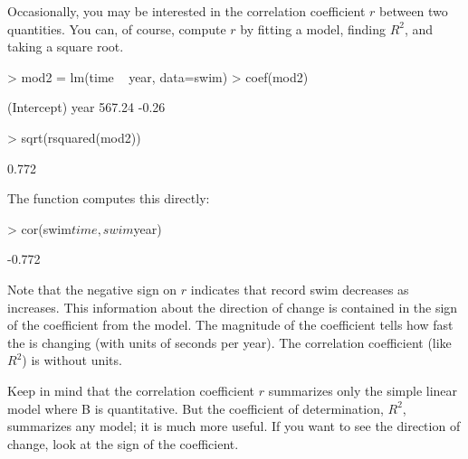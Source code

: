 Occasionally, you may be interested in the correlation coefficient $r$ between two
quantities.  
You can, of course, compute $r$ by fitting a model, finding $R^2$,
and taking a square root.
\begin{Schunk}
\begin{Sinput}
> mod2 = lm(time ~ year, data=swim)
> coef(mod2)
\end{Sinput}
\begin{Soutput}
(Intercept)        year 
     567.24       -0.26 
\end{Soutput}
\begin{Sinput}
> sqrt(rsquared(mod2))
\end{Sinput}
\begin{Soutput}
[1] 0.772
\end{Soutput}
\end{Schunk}

The  function computes this directly:
\begin{Schunk}
\begin{Sinput}
> cor(swim$time, swim$year)
\end{Sinput}
\begin{Soutput}
[1] -0.772
\end{Soutput}
\end{Schunk}

Note that the negative sign on $r$ indicates that record swim 
decreases as  increases.  This information about the
direction of change is contained in the sign of the coefficient from
the model.  The magnitude of the coefficient tells how fast the
 is changing (with units of seconds per year).  The
correlation coefficient (like $R^2$) is without units.

Keep in mind that the correlation coefficient $r$ summarizes only the
simple linear model  where B is quantitative.  But the
coefficient of determination, $R^2$, summarizes any model; it is much
more useful.  If you want to see the direction of change, look at the
sign of the coefficient.


